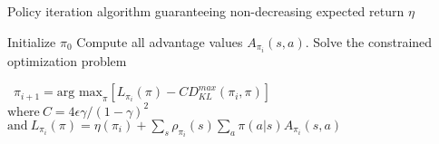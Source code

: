 \documentclass[12pt,a4paper]{article}
\begin{document}
\newpage

\begin{algorithm}
\caption{Policy iteration algorithm guaranteeing non-decreasing expected return $\eta$}
\begin{algorithmic}
	\State Initialize $\pi_{0}$
		\State Compute all advantage values $A_{\pi_i}(s,a)$.
		\State Solve the constrained optimization problem
		
		\State \ $\pi_{i+1}  =  \text{arg max}_{\pi}[L_{\pi_i}(\pi) - CD_{KL}^{max}(\pi_{i},\pi)]$\\
				\qquad\qquad$\text{where}\ C = 4\epsilon\gamma/(1-\gamma)^{2}$\\
				\qquad\qquad$\text{and}\ L_{\pi_i}(\pi) = \eta(\pi_{i}) + \sum_{s}^{}\rho_{\pi_i}(s)\sum_{a}^{}\pi(a|s)A_{\pi_i}(s,a)$
	\EndFor
\end{algorithmic}
\end{algorithm}


\end{document}
